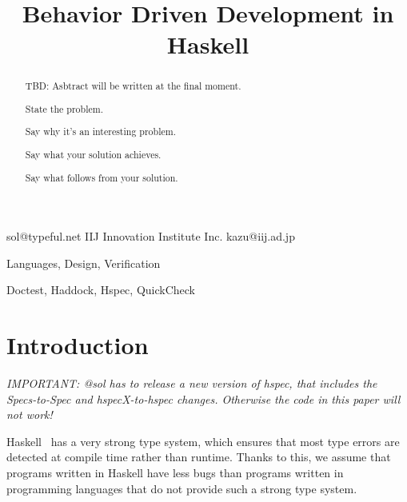 \documentclass[preprint]{sigplanconf}
\begin{document}
\copyrightdata{[to be supplied]}


\title{Behavior Driven Development in Haskell}

           {}
           {sol@typeful.net}
           {IIJ Innovation Institute Inc.}
           {kazu@iij.ad.jp}

\maketitle

\begin{abstract}

TBD: Asbtract will be written at the final moment.

State the problem.

Say why it’s an interesting problem.

Say what your solution achieves.

Say what follows from your solution.

\end{abstract}


\terms Languages, Design, Verification

\keywords Doctest, Haddock, Hspec, QuickCheck

\section{Introduction}

\emph{IMPORTANT: @sol has to release a new version of hspec, that
includes the Specs-to-Spec and hspecX-to-hspec changes.  Otherwise the
code in this paper will not work!}


Haskell~\cite{haskell} has a very strong type system, which ensures that most type errors are
detected at compile time rather than runtime.  Thanks to this, we assume that
programs written in Haskell have less bugs than programs written in programming
languages that do not provide such a strong type system.
\end{document}
